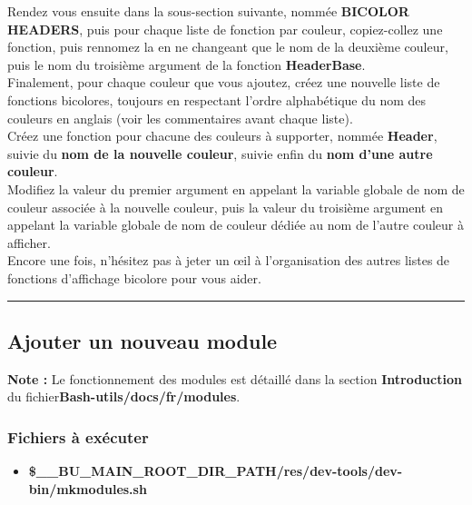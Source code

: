 \documentclass[a4paper,10pt]{article}
\begin{document}
Rendez vous ensuite dans la sous-section suivante, nommée \textbf{BICOLOR HEADERS}, puis pour chaque liste de fonction par couleur, copiez-collez une fonction, puis rennomez la en ne changeant que le nom de la deuxième couleur, puis le nom du troisième argument de la fonction \textbf{\color{mauve}HeaderBase}.\\[1\baselineskip]

Finalement, pour chaque couleur que vous ajoutez, créez une nouvelle liste de fonctions bicolores,
toujours en respectant l'ordre alphabétique du nom des couleurs en anglais (voir les commentaires
avant chaque liste).\\[1\baselineskip]

Créez une fonction pour chacune des couleurs à supporter, nommée \textbf{\color{mauve}Header}, suivie du \textbf{\color{mauve}nom de la nouvelle couleur}, suivie enfin du \textbf{\color{mauve}nom d'une autre couleur}.\\[1\baselineskip]

Modifiez la valeur du premier argument en appelant la variable globale de nom de couleur associée à la nouvelle couleur, puis la valeur du troisième argument en appelant la variable globale de nom de couleur dédiée au nom de l'autre couleur à afficher.\\[1\baselineskip]

Encore une fois, n'hésitez pas à jeter un œil à l'organisation des autres listes de fonctions d'affichage\linebreak
bicolore pour vous aider.\\[1\baselineskip]



\color{green}\par\noindent\rule{\textwidth}{0.4pt}\color{white}

\color{green}
\subsection{Ajouter un nouveau module}\color{white}

\textbf{Note :} Le fonctionnement des modules est détaillé dans la section \textbf{\color{red}Introduction} du fichier\linebreak \textbf{\color{lime}Bash-utils/docs/fr/modules}.

\color{blue}
\subsubsection{Fichiers à exécuter}\color{white}
\begin{itemize}
    \item \textbf{\color{orange}\$\_\_BU\_MAIN\_ROOT\_DIR\_PATH\color{lime}/res/dev-tools/dev-bin/mkmodules.sh}
\end{itemize}
\end{document}
